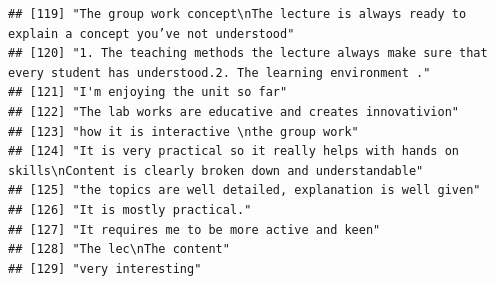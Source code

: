\documentclass[
]{article}
\begin{document}
\begin{verbatim}
## [119] "The group work concept\nThe lecture is always ready to explain a concept you’ve not understood"                                                                                                                                                   
## [120] "1. The teaching methods the lecture always make sure that every student has understood.2. The learning environment ."                                                                                                                             
## [121] "I'm enjoying the unit so far"                                                                                                                                                                                                                     
## [122] "The lab works are educative and creates innovativion"                                                                                                                                                                                             
## [123] "how it is interactive \nthe group work"                                                                                                                                                                                                           
## [124] "It is very practical so it really helps with hands on skills\nContent is clearly broken down and understandable"                                                                                                                                  
## [125] "the topics are well detailed, explanation is well given"                                                                                                                                                                                          
## [126] "It is mostly practical."                                                                                                                                                                                                                          
## [127] "It requires me to be more active and keen"                                                                                                                                                                                                        
## [128] "The lec\nThe content"                                                                                                                                                                                                                             
## [129] "very interesting"                                                                                                                                                                                                                                 

\end{verbatim}
\end{document}
